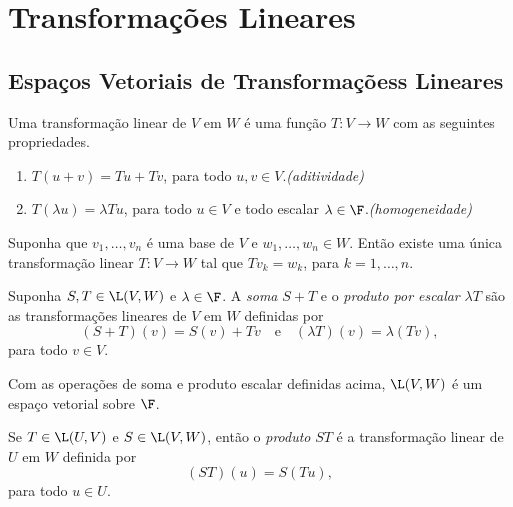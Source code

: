 \documentclass{article}
\begin{document}
\section{Transformações Lineares}

\subsection{Espaços Vetoriais de Transformaçõess Lineares}
\begin{defn}
    Uma transformação linear de \(V\) em \(W\) é uma função \(T: V \to W\) com as seguintes propriedades.
    \begin{enumerate}
        \item \(T(u + v) = Tu + Tv\), para todo \(u, v \in V\).\hfill\emph{(aditividade)}
        \item \(T(\lambda u) = \lambda Tu\), para todo \(u \in V\) e todo escalar \(\lambda \in \F\).\hfill\emph{(homogeneidade)}
    \end{enumerate}
\end{defn}

\begin{lem}
    Suponha que \(v_1,\ldots,v_n\) é uma base de \(V\) e \(w_1,\ldots,w_n \in W\). Então existe uma única transformação linear \(T: V \to W\) tal que \(Tv_k = w_k\), para \(k = 1, \ldots, n\).
\end{lem}

\begin{defn}
    Suponha \(S, T \in \L(V, W)\) e \(\lambda \in \F\). A \emph{soma} \(S + T\) e o \emph{produto por escalar} \(\lambda T\) são as transformações lineares de \(V\) em \(W\) definidas por
    \[
        (S + T)(v) = S(v) + Tv \quad \text{e} \quad (\lambda T)(v) = \lambda (Tv),
    \]
    \noindent para todo \(v \in V\).
\end{defn}

\begin{cor}
    Com as operações de soma e produto escalar definidas acima, \(\L(V, W)\) é um espaço vetorial sobre \(\F\).
\end{cor}

\begin{defn}
    Se \(T \in \L(U, V)\) e \(S \in \L(V, W)\), então o \emph{produto} \(ST\) é a transformação linear de \(U\) em \(W\) definida por
    \[
        (ST)(u) = S(Tu),
    \]
    \noindent para todo \(u \in U\).
\end{defn}
\end{document}

